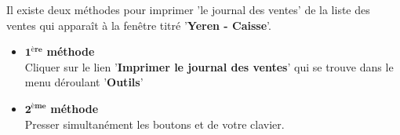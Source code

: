 Il existe deux m\'ethodes pour imprimer 'le journal
des ventes' de la liste des ventes qui appara\^it \`a
la fen\^etre titr\'e '\textbf{Yeren - Caisse}'.

\begin{itemize}[]
	\item \textcolor{purplish}{$\mathbf{1^{\text{\`ere}}}$ \textbf{m\'ethode}}\\
		Cliquer sur le lien '\textbf{Imprimer le journal des
		ventes}' qui se trouve dans le menu
		d\'eroulant '\textbf{Outils}'\\

	\item \textcolor{purplish}{$\mathbf{2^{\text{\`eme}}}$ \textbf{m\'ethode}}\\
		Presser simultan\'ement les boutons 
		et  de votre clavier.
\end{itemize}
